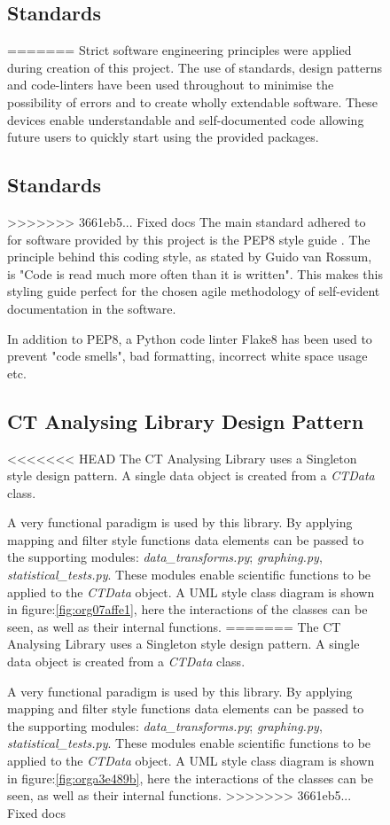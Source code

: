 \documentclass[11pt]{report}
\begin{document}
\begin{figure}[htbp]
{\subsection{Standards}
\label{sec:org00a1814}
=======
\label{sec:org1059d64}
Strict software engineering principles were applied during creation of this project. The use of standards, design patterns and code-linters have been used throughout to minimise the possibility of errors and to create wholly extendable software. These devices enable understandable and self-documented code allowing future users to quickly start using the provided packages.
\subsection{Standards}
\label{sec:org13e2037}
>>>>>>> 3661eb5... Fixed docs
The main standard adhered to for software provided by this project is the PEP8 style guide \cite{VanRossum}. The principle behind this coding style, as stated by Guido van Rossum, is "Code is read much more often than it is written". This makes this styling guide perfect for the chosen agile methodology of self-evident documentation in the software.

In addition to PEP8, a Python code linter Flake8 has been used to prevent "code smells", bad formatting, incorrect white space usage etc.

\subsection{CT Analysing Library Design Pattern}
<<<<<<< HEAD
\label{sec:org52e01f2}
The CT Analysing Library uses a Singleton style design pattern. A single data object is created from a \emph{CTData} class.

A very functional paradigm is used by this library. By applying mapping and filter style functions data elements can be passed to the supporting modules: \emph{data\_transforms.py}; \emph{graphing.py}, \emph{statistical\_tests.py}. These modules enable scientific functions to be applied to the \emph{CTData} object. A UML style class diagram is shown in figure:\ref{fig:org07affe1}, here the interactions of the classes can be seen, as well as their internal functions.
=======
\label{sec:orgb9369e5}
The CT Analysing Library uses a Singleton style design pattern. A single data object is created from a \emph{CTData} class.

A very functional paradigm is used by this library. By applying mapping and filter style functions data elements can be passed to the supporting modules: \emph{data\_transforms.py}; \emph{graphing.py}, \emph{statistical\_tests.py}. These modules enable scientific functions to be applied to the \emph{CTData} object. A UML style class diagram is shown in figure:\ref{fig:orga3e489b}, here the interactions of the classes can be seen, as well as their internal functions.
>>>>>>> 3661eb5... Fixed docs

}
\end{figure}
\end{document}
